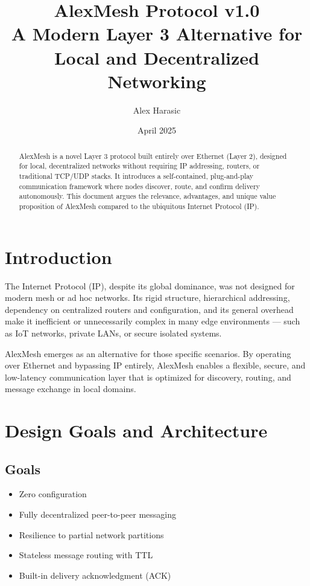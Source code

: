 \documentclass[11pt]{article}
\title{AlexMesh Protocol v1.0 \\ \large A Modern Layer 3 Alternative for Local and Decentralized Networking}
\author{Alex Harasic}
\date{April 2025}
\begin{document}
\maketitle

\begin{abstract}
AlexMesh is a novel Layer 3 protocol built entirely over Ethernet (Layer 2), designed for local, decentralized networks without requiring IP addressing, routers, or traditional TCP/UDP stacks. It introduces a self-contained, plug-and-play communication framework where nodes discover, route, and confirm delivery autonomously. This document argues the relevance, advantages, and unique value proposition of AlexMesh compared to the ubiquitous Internet Protocol (IP).
\end{abstract}

\section{Introduction}
The Internet Protocol (IP), despite its global dominance, was not designed for modern mesh or ad hoc networks. Its rigid structure, hierarchical addressing, dependency on centralized routers and configuration, and its general overhead make it inefficient or unnecessarily complex in many edge environments --- such as IoT networks, private LANs, or secure isolated systems.

AlexMesh emerges as an alternative for those specific scenarios. By operating over Ethernet and bypassing IP entirely, AlexMesh enables a flexible, secure, and low-latency communication layer that is optimized for discovery, routing, and message exchange in local domains.

\section{Design Goals and Architecture}

\subsection{Goals}
\begin{itemize}[noitemsep]
  \item Zero configuration
  \item Fully decentralized peer-to-peer messaging
  \item Resilience to partial network partitions
  \item Stateless message routing with TTL
  \item Built-in delivery acknowledgment (ACK)
\end{itemize}
\end{document}
